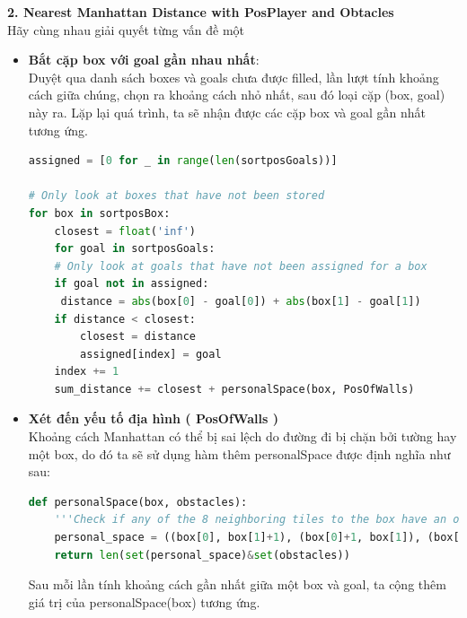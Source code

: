 \documentclass[12pt]{article}
\begin{document}
\hspace{-1em}\textbf{2. Nearest Manhattan Distance with PosPlayer and Obtacles} \\

Hãy cùng nhau giải quyết từng vấn đề một
\begin{itemize}
	\item \textbf{Bắt cặp box với goal gần nhau nhất}: \\
	Duyệt qua danh sách boxes và goals chưa được filled, lần lượt tính khoảng cách giữa chúng, chọn ra khoảng cách nhỏ nhất, sau đó loại cặp (box, goal) này ra. Lặp lại quá trình, ta sẽ nhận được các cặp box và goal gần nhất tương ứng.
\begin{tcolorbox}[boxrule=0.5pt, colback=white]
  \begin{lstlisting}[language=python, numbers=none, basicstyle=\ttfamily\footnotesize]
assigned = [0 for _ in range(len(sortposGoals))]

# Only look at boxes that have not been stored
for box in sortposBox:
	closest = float('inf')  
	for goal in sortposGoals:
	# Only look at goals that have not been assigned for a box
	if goal not in assigned:   
	 distance = abs(box[0] - goal[0]) + abs(box[1] - goal[1])
	if distance < closest:
		closest = distance
		assigned[index] = goal
	index += 1
	sum_distance += closest + personalSpace(box, PosOfWalls)
  \end{lstlisting}
  \end{tcolorbox}

  \item \textbf{Xét đến yếu tố địa hình ( PosOfWalls )} \\
  Khoảng cách Manhattan có thể bị sai lệch do đường đi bị chặn bởi tường hay một box, do đó ta sẽ sử dụng hàm thêm personalSpace được định nghĩa như sau:
  \begin{tcolorbox}[boxrule=0.5pt, colback=white]
	\begin{lstlisting}[language=python, numbers=none, basicstyle=\ttfamily\footnotesize]
def personalSpace(box, obstacles):
	'''Check if any of the 8 neighboring tiles to the box have an obstacle, if they do increase the cost by number of obstacles in this space'''
	personal_space = ((box[0], box[1]+1), (box[0]+1, box[1]), (box[0]-1, box[1]), (box[0], box[1]-1),(box[0]-1, box[1]-1),(box[0]+1, box[1]+1),(box[0]+1, box[1]-1), (box[0]-1, box[1]+1))
	return len(set(personal_space)&set(obstacles)) 
	\end{lstlisting}
	\end{tcolorbox}
	Sau mỗi lần tính khoảng cách gần nhất giữa một box và goal, ta cộng thêm giá trị của personalSpace(box) tương ứng.


\end{itemize}
\end{document}
